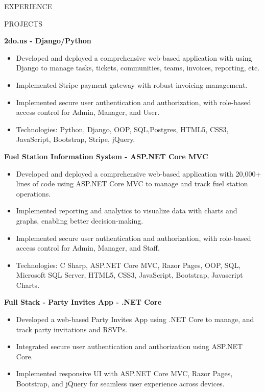 \documentclass{resume} %
\begin{document}
\begin{rSection}{EXPERIENCE}
\begin{rSection}{PROJECTS}
	\item \textbf{2do.us - Django/Python}
	
	\begin{itemize}
		\itemsep -3pt {} 
		\item Developed and deployed a comprehensive web-based application with using Django to manage tasks, tickets, communities, teams, invoices, reporting, etc.
		\item Implemented Stripe payment gateway with robust invoicing management.
		
		\item Implemented secure user authentication and authorization, with role-based access control for Admin, Manager, and User.
		\item Technologies: Python, Django, OOP, SQL,Postgres, HTML5, CSS3, JavaScript, Bootstrap, Stripe, jQuery.
	\end{itemize}


\item \textbf{Fuel Station Information System - ASP.NET Core MVC}

\begin{itemize}
	\item Developed and deployed a comprehensive web-based application with 20,000+ lines of code using ASP.NET Core MVC to manage and track fuel station operations.
	\item Implemented reporting and analytics to visualize data with charts and graphs, enabling better decision-making.
	
	\item Implemented secure user authentication and authorization, with role-based access control for Admin, Manager, and Staff.
	\item Technologies: C Sharp, ASP.NET Core MVC, Razor Pages, OOP, SQL, Microsoft SQL Server, HTML5, CSS3, JavaScript, Bootstrap, Javascript Charts.
\end{itemize}

\item \textbf{Full Stack - Party Invites App - .NET Core}
\begin{itemize}
	\item Developed a web-based Party Invites App using .NET Core to  manage, and track party invitations and RSVPs.
	\item Integrated secure user authentication and authorization using ASP.NET Core.
	\item Implemented responsive UI with ASP.NET Core MVC, Razor Pages, Bootstrap, and jQuery for seamless user experience across devices.
	

\end{itemize}
\end{rSection}
\end{rSection}
\end{document}
